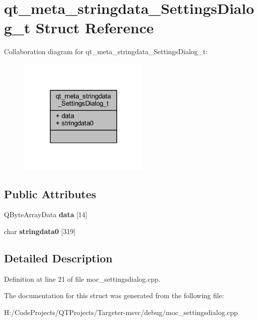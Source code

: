 \hypertarget{structqt__meta__stringdata___settings_dialog__t}{}\section{qt\+\_\+meta\+\_\+stringdata\+\_\+\+Settings\+Dialog\+\_\+t Struct Reference}
\label{structqt__meta__stringdata___settings_dialog__t}


Collaboration diagram for qt\+\_\+meta\+\_\+stringdata\+\_\+\+Settings\+Dialog\+\_\+t\+:
\nopagebreak
\begin{figure}[H]
\begin{center}
\leavevmode
\includegraphics[width=180pt]{structqt__meta__stringdata___settings_dialog__t__coll__graph}
\end{center}
\end{figure}
\subsection*{Public Attributes}
\begin{DoxyCompactItemize}
\item 
\mbox{\label{structqt__meta__stringdata___settings_dialog__t_ad7d49096ed7a8eef35850444e58e7567}} 
Q\+Byte\+Array\+Data {\bfseries data} \mbox{[}14\mbox{]}
\item 
\mbox{\label{structqt__meta__stringdata___settings_dialog__t_ae7fc6b04286324dd23492c2801c865e3}} 
char {\bfseries stringdata0} \mbox{[}319\mbox{]}
\end{DoxyCompactItemize}


\subsection{Detailed Description}


Definition at line 21 of file moc\+\_\+settingsdialog.\+cpp.



The documentation for this struct was generated from the following file\+:\begin{DoxyCompactItemize}
\item 
H\+:/\+Code\+Projects/\+Q\+T\+Projects/\+Targeter-\/msvc/debug/moc\+\_\+settingsdialog.\+cpp\end{DoxyCompactItemize}

